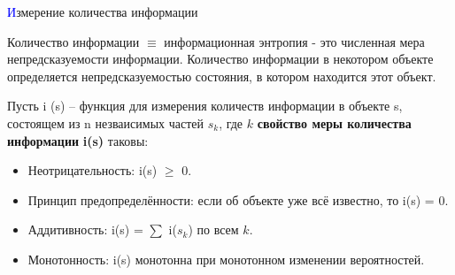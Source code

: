 \begin{frame}[t]{\large \textcolor{blue}{И}змерение количества информации}
	
	\begin{spacing}{0.5}
		\noindent \color[rgb]{0,0.7,0.4} Количество информации $\equiv$ информационная энтропия - \color{black} это численная мера непредсказуемости информации. Количество информации в некотором объекте определяется непредсказуемостью состояния, в котором находится этот объект.
	\end{spacing}
		
	\vspace{0.6cm}
	
	\noindent Пусть i (s) -- функция для измерения количеств информации в объекте s, состоящем из n незваисимых частей $s_k$, где $k$ \color[rgb]{0,0.7,0.4} \textbf{свойство меры количества информации} \color{black} \textbf{i(s)} таковы:
	
	\begin{itemize}
		\item Неотрицательность: i(s) $\geq$ 0.
		\item Принцип предопределённости: если об объекте уже всё известно, то i(s) = 0.
		\item Аддитивность: i(s) = $\sum$ i($s_k$) по всем $k$.
		\item Монотонность: i(s) монотонна при монотонном изменении вероятностей.
	\end{itemize}

\end{frame}